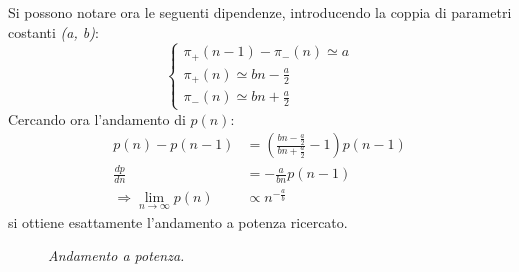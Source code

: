 \documentclass[12pt, a4paper]{book}
\theoremstyle{theorem}
\begin{document}
				Si possono notare ora le seguenti dipendenze, introducendo la coppia di parametri costanti \textit{(a, b)}:
				\begin{equation*}
					\begin{cases}
						\pi_+(n-1)-\pi_-(n)\simeq a\\
						\pi_+(n)\simeq bn-\frac{a}{2}\\
						\pi_-(n)\simeq bn+\frac{a}{2}
					\end{cases}
				\end{equation*}
				Cercando ora l'andamento di $p(n)$:
				\begin{equation}
					\begin{split}
						p(n)-p(n-1)&=\left(\frac{bn-\frac{a}{2}}{bn+\frac{a}{2}}-1\right)p(n-1)\\
						\frac{dp}{dn}&=-\frac{a}{bn}p(n-1)\\
						\Rightarrow\lim_{n\to\infty}p(n)&\propto n^{-\frac{a}{b}}
					\end{split}
				\end{equation}
				si ottiene esattamente l'andamento a potenza ricercato.\\
				\begin{figure}[H]
					\centering
					\caption{\emph{Andamento a potenza.}}
					\label{figure:modello_economico_evoluto}
				\end{figure}
\end{document}
